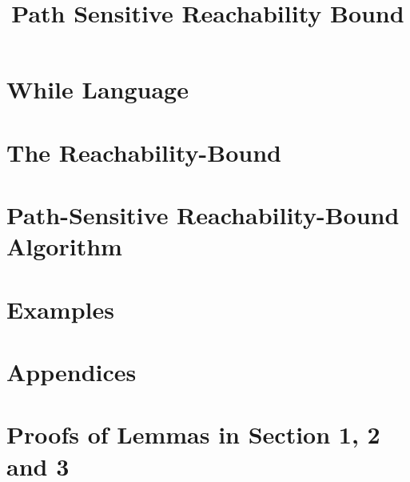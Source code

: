 \documentclass[a4paper,11pt]{article}
\begin{document}
\title{Path Sensitive Reachability Bound}

\author{}

\date{}

\maketitle
%
\tableofcontents

% 
\section{{While Language}}
\label{sec:language}

\section{{The Reachability-Bound}}
\label{sec:execution_rb}

\section{Path-Sensitive Reachability-Bound Algorithm}
\label{sec:static_rb}


\section{Examples}
\label{sec:example}






% 


%
% 
%
\clearpage
\appendix
{}
\section*{Appendices}
\section{Proofs of Lemmas in Section 1, 2 and 3}
\label{apdx:lemma_sec123}

\clearpage
% 
\clearpage
\end{document}
